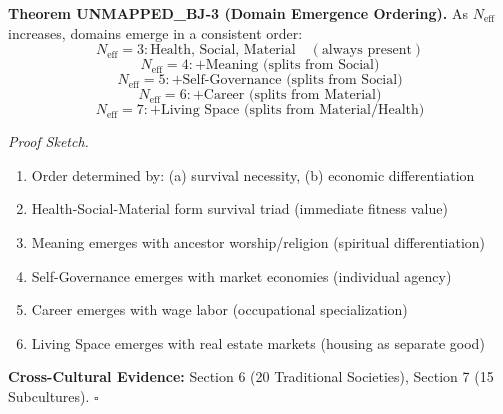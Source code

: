 \begin{tcolorbox}[colback=green!5!white, colframe=green!75!black, title=Theorem UNMAPPED_BJ-3: Domain Emergence Ordering]
\textbf{Theorem UNMAPPED_BJ-3 (Domain Emergence Ordering).}
As $N_{\text{eff}}$ increases, domains emerge in a consistent order:
\begin{equation}
N_{\text{eff}} = 3: \text{Health, Social, Material} \quad (\text{always present})
\end{equation}
\begin{equation}
N_{\text{eff}} = 4: + \text{Meaning (splits from Social)}
\end{equation}
\begin{equation}
N_{\text{eff}} = 5: + \text{Self-Governance (splits from Social)}
\end{equation}
\begin{equation}
N_{\text{eff}} = 6: + \text{Career (splits from Material)}
\end{equation}
\begin{equation}
N_{\text{eff}} = 7: + \text{Living Space (splits from Material/Health)}
\end{equation}

\textit{Proof Sketch.}
\begin{enumerate}[nosep]
\item Order determined by: (a) survival necessity, (b) economic differentiation
\item Health-Social-Material form survival triad (immediate fitness value)
\item Meaning emerges with ancestor worship/religion (spiritual differentiation)
\item Self-Governance emerges with market economies (individual agency)
\item Career emerges with wage labor (occupational specialization)
\item Living Space emerges with real estate markets (housing as separate good)
\end{enumerate}
\textbf{Cross-Cultural Evidence:} Section 6 (20 Traditional Societies), Section 7 (15 Subcultures). \hfill $\square$
\end{tcolorbox}

